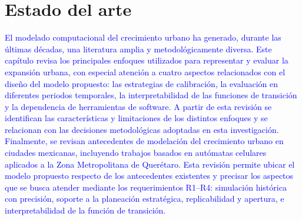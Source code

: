 
\chapter{Estado del arte}
\label{ch:estado-del-arte}

\begin{resumen}
\textcolor{blue}{El modelado computacional del crecimiento urbano ha generado, durante las últimas décadas, una literatura amplia y metodológicamente diversa. Este capítulo revisa los principales enfoques utilizados para representar y evaluar la expansión urbana, con especial atención a cuatro aspectos relacionados con el diseño del modelo propuesto: las estrategias de calibración, la evaluación en diferentes periodos temporales, la interpretabilidad de las funciones de transición y la dependencia de herramientas de software. A partir de esta revisión se identifican las características y limitaciones de los distintos enfoques y se relacionan con las decisiones metodológicas adoptadas en esta investigación. Finalmente, se revisan antecedentes de modelación del crecimiento urbano en ciudades mexicanas, incluyendo trabajos basados en autómatas celulares aplicados a la Zona Metropolitana de Querétaro. Esta revisión permite ubicar el modelo propuesto respecto de los antecedentes existentes y precisar los aspectos que se busca atender mediante los requerimientos R1--R4: simulación histórica con precisión, soporte a la planeación estratégica, replicabilidad y apertura, e interpretabilidad de la función de transición.}





\end{resumen}
